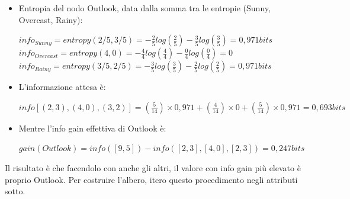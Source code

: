 \begin{itemize}
    \item Entropia del nodo Outlook, data dalla somma tra le entropie (Sunny, Overcast, Rainy):
    \begin{center}
        \begin{math}
            info_{Sunny} = entropy(2/5, 3/5) = -\frac{2}{5} log(\frac{2}{5}) - \frac{3}{5} log(\frac{3}{5}) = 0,971 bits  
        \end{math}
        \\[2ex]
        \begin{math}
            info_{Overcast} = entropy(4,0) = -\frac{4}{4} log(\frac{4}{4}) - \frac{0}{4} log(\frac{0}{4}) = 0  
        \end{math}
        \\[2ex]
        \begin{math}
            info_{Rainy} = entropy(3/5, 2/5) = -\frac{3}{5} log(\frac{3}{5}) - \frac{2}{5} log(\frac{2}{5}) = 0,971 bits
        \end{math}   
        \\
    \end{center}
    \item L'informazione attesa è:
    \begin{center}
        \begin{math}
            info[(2,3), (4,0), (3,2)] = (\frac{5}{14}) \times 0,971 + (\frac{4}{14}) \times 0 + (\frac{5}{14}) \times 0,971 = 0,693 bits
        \end{math}
    \end{center}
    \item Mentre l'info gain effettiva di Outlook è:
    \begin{center}
        \begin{math}
            gain(Outlook) = info([9,5]) - info([2,3], [4,0], [2,3]) = 0,247 bits
        \end{math}
    \end{center}
\end{itemize}
Il risultato è che facendolo con anche gli altri, il valore con info gain più elevato è proprio Outlook. Per costruire l'albero, itero questo procedimento negli attributi sotto. 

\newpage


